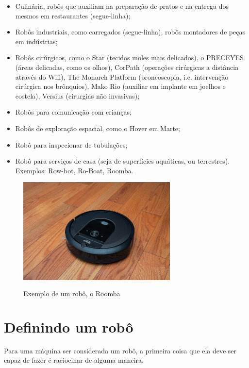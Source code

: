 \begin{itemize}
\item Culinária, robôs que auxiliam na preparação de pratos e na entrega dos mesmos em restaurantes (segue-linha);

\item Robôs industriais, como carregados (segue-linha), robôs montadores de peças em indústrias;

\item Robôs cirúrgicos, como o Star (tecidos moles mais delicados), o PRECEYES (áreas delicadas, como os olhos), CorPath (operações cirúrgicas a distância através do Wifi), The Monarch Platform (broncoscopia, i.e. intervenção cirúrgica nos brônquios), Mako Rio (auxiliar em implante em joelhos e costela), Versius (cirurgias não invasivas);

\item Robôs para comunicação com crianças;

\item Robôs de exploração espacial, como o Hover em Marte;

\item Robô para inspecionar de tubulações;

\item Robô para serviços de casa (seja de superfícies aquáticas, ou terrestres). Exemplos: Row-bot, Ro-Boat, Roomba.
\end{itemize}

    \begin{figure}[h]
    \caption{Exemplo de um robô, o Roomba}
     
    \centering 
    \includegraphics[width=8cm]{Figuras/roomba.jpg}
    \label{figura:roomba.jpeg}
    \end{figure}
 

\section{Definindo um robô}
\paragraph{}
Para uma máquina ser considerada um robô, a primeira coisa que ela deve ser capaz de fazer é raciocinar de alguma maneira.\\

